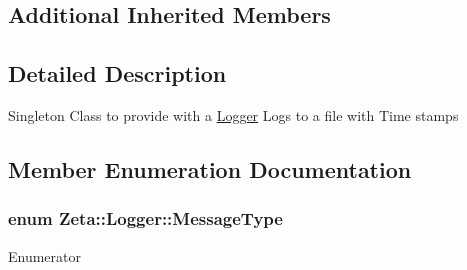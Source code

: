 \subsection*{Additional Inherited Members}


\subsection{Detailed Description}
Singleton Class to provide with a \hyperlink{classZeta_1_1Logger}{Logger} Logs to a file with Time stamps 

\subsection{Member Enumeration Documentation}
\hypertarget{classZeta_1_1Logger_a8d3c7c723be28f87ac974c2dd07a1659}{
\subsubsection[{Message\+Type}]{\setlength{\rightskip}{0pt plus 5cm}enum {\bf Zeta\+::\+Logger\+::\+Message\+Type}\hspace{0.3cm}{\ttfamily [strong]}}}\label{classZeta_1_1Logger_a8d3c7c723be28f87ac974c2dd07a1659}
\begin{Desc}
\item[Enumerator]\par
\begin{description}
\item[{\em 
\hypertarget{classZeta_1_1Logger_a8d3c7c723be28f87ac974c2dd07a1659a4059b0251f66a18cb56f544728796875}{Info}\label{classZeta_1_1Logger_a8d3c7c723be28f87ac974c2dd07a1659a4059b0251f66a18cb56f544728796875}
}]\item[{\em 
\hypertarget{classZeta_1_1Logger_a8d3c7c723be28f87ac974c2dd07a1659a0eaadb4fcb48a0a0ed7bc9868be9fbaa}{Warning}\label{classZeta_1_1Logger_a8d3c7c723be28f87ac974c2dd07a1659a0eaadb4fcb48a0a0ed7bc9868be9fbaa}
}]\item[{\em 
\hypertarget{classZeta_1_1Logger_a8d3c7c723be28f87ac974c2dd07a1659a902b0d55fddef6f8d651fe1035b7d4bd}{Error}\label{classZeta_1_1Logger_a8d3c7c723be28f87ac974c2dd07a1659a902b0d55fddef6f8d651fe1035b7d4bd}
}]\item[{\em 
\hypertarget{classZeta_1_1Logger_a8d3c7c723be28f87ac974c2dd07a1659a798ccc83d545e9494c77e9d6b3590267}{Lua\+Error}\label{classZeta_1_1Logger_a8d3c7c723be28f87ac974c2dd07a1659a798ccc83d545e9494c77e9d6b3590267}
}]\end{description}
\end{Desc}


